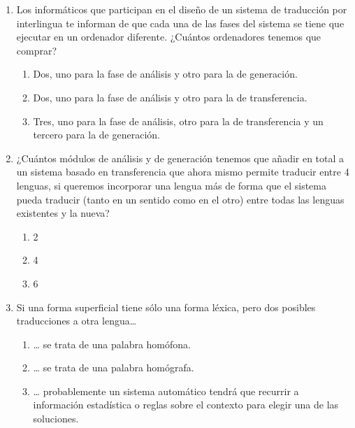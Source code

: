 \begin{enumerate}
\item Los informáticos que participan en el diseño de un sistema de traducción por interlingua te informan de que cada una de las fases del sistema se tiene que ejecutar en un ordenador diferente. ¿Cuántos ordenadores tenemos que comprar? \begin{enumerate} \item Dos, uno para la fase de análisis y otro para la de generación. \item Dos, uno para la fase de análisis y otro para la de transferencia. \item Tres, uno para la fase de análisis, otro para la de transferencia y un tercero para la de generación. \end{enumerate} 

\item ¿Cuántos módulos de análisis y de generación tenemos que añadir en total a un sistema basado en transferencia que ahora mismo permite traducir entre 4 lenguas, si queremos incorporar una lengua más de forma que el sistema pueda traducir (tanto en un sentido como en el otro) entre todas las lenguas existentes y la nueva? \begin{enumerate} \item 2 \item 4 \item 6 \end{enumerate} 

\item Si una forma superficial tiene sólo una forma léxica, pero dos posibles traducciones a otra lengua{\ldots} \begin{enumerate} \item {\ldots} se trata de una palabra homófona. \item {\ldots} se trata de una palabra homógrafa. \item {\ldots} probablemente un sistema automático tendrá que recurrir a información estadística o reglas sobre el contexto para elegir una de las soluciones. \end{enumerate} 


\end{enumerate}
